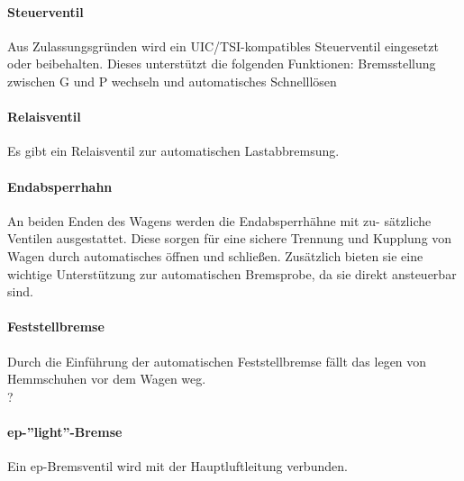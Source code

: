\paragraph{Steuerventil}\label{sec:Bremsart}
Aus Zulassungsgründen wird ein UIC/TSI-kompatibles Steuerventil eingesetzt oder beibehalten. Dieses unterstützt die folgenden Funktionen: Bremsstellung zwischen G und P wechseln und automatisches Schnelllösen

\paragraph{Relaisventil} Es gibt ein Relaisventil zur automatischen Lastabbremsung.

\paragraph{Endabsperrhahn} \label{sec:Endabsperrhahn}
An beiden Enden des Wagens werden die Endabsperrhähne mit zu- sätzliche Ventilen ausgestattet. Diese sorgen für eine sichere Trennung und Kupplung von Wagen durch automatisches öffnen und schließen. Zusätzlich bieten sie eine wichtige Unterstützung zur automatischen Bremsprobe, da sie direkt ansteuerbar sind.


\paragraph{Feststellbremse}
Durch die Einführung der automatischen Feststellbremse fällt das legen von Hemmschuhen vor dem Wagen weg. \\?

\paragraph{ep-''light''-Bremse}
Ein ep-Bremsventil wird mit der Hauptluftleitung verbunden.


